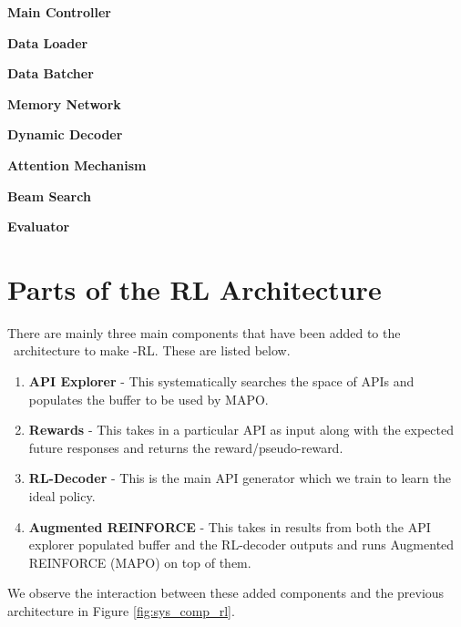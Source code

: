 \noindent\textbf{Main Controller}

\noindent\textbf{Data Loader}

\noindent\textbf{Data Batcher}

\noindent\textbf{Memory Network}

\noindent\textbf{Dynamic Decoder}

\noindent\textbf{Attention Mechanism}

\noindent\textbf{Beam Search}

\noindent\textbf{Evaluator}

\section{Parts of the \sys\-RL Architecture}

There are mainly three main components that have been added to the \sys\ architecture to make \sys -RL. These are listed below.

\begin{enumerate}
	\item \textbf{API Explorer} - This systematically searches the space of APIs and populates the buffer to be used by MAPO.
	\item \textbf{Rewards} - This takes in a particular API as input along with the expected future responses and returns the reward/pseudo-reward.
	\item \textbf{RL-Decoder} - This is the main API generator which we train to learn the ideal policy.
	\item \textbf{Augmented REINFORCE} - This takes in results from both the API explorer populated buffer and the RL-decoder outputs and runs Augmented REINFORCE (MAPO) on top of them.
\end{enumerate}

We observe the interaction between these added components and the previous architecture in Figure \ref{fig:sys_comp_rl}.

